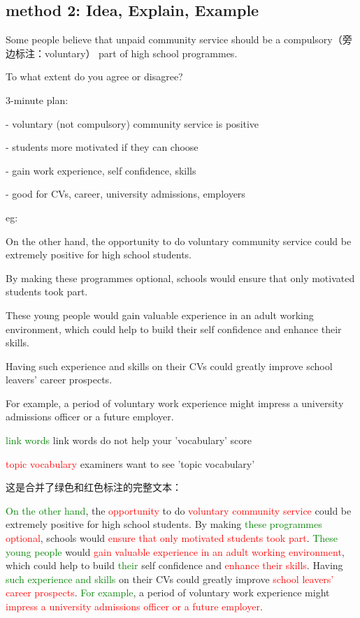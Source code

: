 \documentclass[12pt,a4paper]{article}
\newcommand{\textred}[1]{\textcolor{red}{#1}}  %
\newcommand{\textgreen}[1]{\textcolor{green}{#1}}  %
\begin{document}
\subsection{method 2: Idea, Explain, Example}

Some people believe that unpaid community service should be a compulsory（旁边标注：voluntary） part of high school programmes.

To what extent do you agree or disagree?

3-minute plan:

- voluntary (not compulsory) community service is positive

- students more motivated if they can choose

- gain work experience, self confidence, skills

- good for CVs, career, university admissions, employers

eg:

On the other hand, the opportunity to do voluntary community service could be extremely positive for high school students.

By making these programmes optional, schools would ensure that only motivated students took part.

These young people would gain valuable experience in an adult working environment, which could help to build their self confidence and enhance their skills.

Having such experience and skills on their CVs could greatly improve school leavers’ career prospects.

For example, a period of voluntary work experience might impress a university admissions officer or a future employer.

\textgreen{link words} {\tiny link words do not help your 'vocabulary' score}

\textred{topic vocabulary} {\tiny examiners want to see 'topic vocabulary'}

这是合并了绿色和红色标注的完整文本：

\textgreen{On the other hand}, the \textred{opportunity} to do \textred{voluntary community service} could be extremely positive for high school students. 
By making \textgreen{these programmes} \textred{optional}, schools would \textred{ensure that only motivated students took part}. 
\textgreen{These young people} would \textred{gain valuable experience in an adult working environment}, which could help to build \textgreen{their} self confidence and \textred{enhance their skills}. 
Having \textgreen{such experience and skills} on their CVs could greatly improve \textred{school leavers' career prospects}. 
\textgreen{For example}, a period of voluntary work experience might \textred{impress a university admissions officer or a future employer}.
\end{document}
